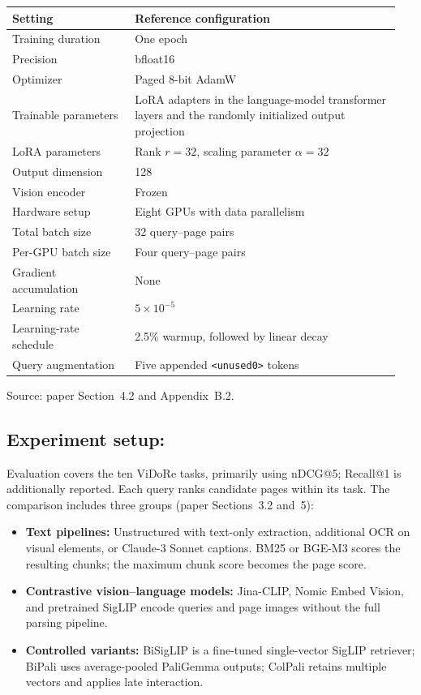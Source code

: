 \documentclass[11pt,a4paper]{article}
\begin{document}
\begingroup
\renewcommand{\arraystretch}{1.2}
\begin{tabular}{@{}p{0.30\linewidth}p{0.65\linewidth}@{}}
    \toprule
    \textbf{Setting} & \textbf{Reference configuration} \\
    \midrule
    Training duration & One epoch \\
    Precision & bfloat16 \\
    Optimizer & Paged 8-bit AdamW \\
    Trainable parameters & LoRA adapters in the language-model transformer layers and the randomly initialized output projection \\
    LoRA parameters & Rank \(r=32\), scaling parameter \(\alpha=32\) \\
    Output dimension & 128 \\
    Vision encoder & Frozen \\
    Hardware setup & Eight GPUs with data parallelism \\
    Total batch size & 32 query--page pairs \\
    Per-GPU batch size & Four query--page pairs \\
    Gradient accumulation & None \\
    Learning rate & \(5\times10^{-5}\) \\
    Learning-rate schedule & 2.5\% warmup, followed by linear decay \\
    Query augmentation & Five appended \texttt{<unused0>} tokens \\
    \bottomrule
\end{tabular}
\endgroup

Source: paper Section~4.2 and Appendix~B.2.

\subsection{Experiment setup:}
Evaluation covers the ten ViDoRe tasks, primarily using nDCG@5; Recall@1 is additionally reported. Each query ranks candidate pages within its task. The comparison includes three groups (paper Sections~3.2 and~5):
\begin{itemize}
    \item \textbf{Text pipelines:} Unstructured with text-only extraction, additional OCR on visual elements, or Claude-3 Sonnet captions. BM25 or BGE-M3 scores the resulting chunks; the maximum chunk score becomes the page score.
    \item \textbf{Contrastive vision--language models:} Jina-CLIP, Nomic Embed Vision, and pretrained SigLIP encode queries and page images without the full parsing pipeline.
    \item \textbf{Controlled variants:} BiSigLIP is a fine-tuned single-vector SigLIP retriever; BiPali uses average-pooled PaliGemma outputs; ColPali retains multiple vectors and applies late interaction.
\end{itemize}
\end{document}
